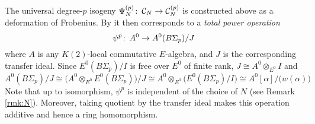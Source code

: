 \documentclass{gtpart}
\theoremstyle{definition}
\theoremstyle{remark}
\def\co{\colon\thinspace}
\newcommand{\CC}{{\cal C}}
\newcommand{\A}{\alpha}
\renewcommand{\=}{\approx}
\renewcommand{\-}{\sim}
\numberwithin{equation}{section}
\numberwithin{thm}{section}
\begin{document}
The universal degree-$p$ isogeny $\Psi_N^{(p)} \co \CC_N \to \CC_N^{(p)}$ 
is constructed above as a deformation of Frobenius.  
By \cite[Theorem B]{cong} it then corresponds to a {\em total power operation} 
\begin{equation}
 \label{psi}
 \psi^p \co A^0 \to A^0(B\Sigma_p) / J 
\end{equation}
where $A$ is any $K(2)$-local commutative $E$-algebra, and $J$ is the corresponding transfer ideal.  
Since $E^0(B\Sigma_p) / I$ is free over $E^0$ of finite rank, $J \cong A^0 \otimes_{E^0} I$ and 
\[
 A^0(B\Sigma_p) / J \cong \big( A^0 \otimes_{E^0} E^0(B\Sigma_p) \big) / J \cong A^0 \otimes_{E^0} \big( E^0(B\Sigma_p) / I \big) \cong A^0[\A] / \big( w(\A) \big) 
\]
Note that up to isomorphism, $\psi^p$ is independent of the choice of $N$ (see Remark \ref{rmk:N}).  
Moreover, taking quotient by the transfer ideal makes this operation additive and hence a ring homomorphism.  
\end{document}
